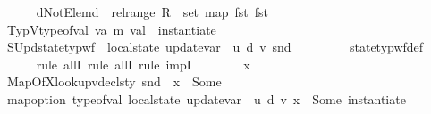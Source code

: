 \begin{isabellebody}
\ \ \ \ \isamarkupfalse%
\ dNotElem{\isacharcolon}{\kern0pt}{\isachardoublequoteopen}d\ {\isasymnotin}\ rel{\isacharunderscore}{\kern0pt}range\ R\ {\isasymunion}\ set\ {\isacharparenleft}{\kern0pt}map\ fst\ {\isacharparenleft}{\kern0pt}fst\ {\isasymLambda}{\isacharparenright}{\kern0pt}{\isacharparenright}{\kern0pt}{\isachardoublequoteclose}\isanewline
\ \ \ \ \isamarkupfalse%
\ TypV{\isacharcolon}{\kern0pt}{\isachardoublequoteopen}type{\isacharunderscore}{\kern0pt}of{\isacharunderscore}{\kern0pt}val\ {\isacharparenleft}{\kern0pt}v{\isacharcolon}{\kern0pt}{\isacharcolon}{\kern0pt}{\isacharparenleft}{\kern0pt}{\isacharprime}{\kern0pt}a{\isacharcomma}{\kern0pt}\ {\isacharprime}{\kern0pt}m{\isacharparenright}{\kern0pt}\ val{\isacharparenright}{\kern0pt}\ {\isacharequal}{\kern0pt}\ instantiate\ {\isasymOmega}\ {\isasymtau}{\isachardoublequoteclose}\isanewline
\ \ \ \ \isamarkupfalse%
\ S{}Upd{\isacharcolon}{\kern0pt}{\isachardoublequoteopen}state{\isacharunderscore}{\kern0pt}typ{\isacharunderscore}{\kern0pt}wf\ {\isasymOmega}\ {\isacharparenleft}{\kern0pt}local{\isacharunderscore}{\kern0pt}state\ {\isacharparenleft}{\kern0pt}update{\isacharunderscore}{\kern0pt}var\ {\isasymLambda}{\isacharprime}{\kern0pt}\ u\ d\ v{\isacharparenright}{\kern0pt}{\isacharparenright}{\kern0pt}\ {\isacharparenleft}{\kern0pt}snd\ {\isasymLambda}{\isacharprime}{\kern0pt}{\isacharparenright}{\kern0pt}{\isachardoublequoteclose}\isanewline
\ \ \ \ \ \ \isamarkupfalse%
\ state{\isacharunderscore}{\kern0pt}typ{\isacharunderscore}{\kern0pt}wf{\isacharunderscore}{\kern0pt}def\isanewline
\ \ \ \ \isamarkupfalse%
\ {\isacharparenleft}{\kern0pt}rule\ allI{\isacharcomma}{\kern0pt}\ rule\ allI{\isacharcomma}{\kern0pt}\ rule\ impI{\isacharparenright}{\kern0pt}\isanewline
\ \ \ \ \ \ \isamarkupfalse%
\ x\ {\isasymtau}{\isacharprime}{\kern0pt}\isanewline
\ \ \ \ \ \ \isamarkupfalse%
\ MapOfX{\isacharcolon}{\kern0pt}{\isachardoublequoteopen}lookup{\isacharunderscore}{\kern0pt}vdecls{\isacharunderscore}{\kern0pt}ty\ {\isacharparenleft}{\kern0pt}snd\ {\isasymLambda}{\isacharprime}{\kern0pt}{\isacharparenright}{\kern0pt}\ x\ {\isacharequal}{\kern0pt}\ Some\ {\isasymtau}{\isacharprime}{\kern0pt}{\isachardoublequoteclose}\isanewline
\ \ \ \ \ \ \isamarkupfalse%
\ {\isachardoublequoteopen}map{\isacharunderscore}{\kern0pt}option\ type{\isacharunderscore}{\kern0pt}of{\isacharunderscore}{\kern0pt}val\ {\isacharparenleft}{\kern0pt}local{\isacharunderscore}{\kern0pt}state\ {\isacharparenleft}{\kern0pt}update{\isacharunderscore}{\kern0pt}var\ {\isasymLambda}{\isacharprime}{\kern0pt}\ u\ d\ v{\isacharparenright}{\kern0pt}\ x{\isacharparenright}{\kern0pt}\ {\isacharequal}{\kern0pt}\ Some\ {\isacharparenleft}{\kern0pt}instantiate\ {\isasymOmega}\ {\isasymtau}{\isacharprime}{\kern0pt}{\isacharparenright}{\kern0pt}{\isachardoublequoteclose}\isanewline

\end{isabellebody}
